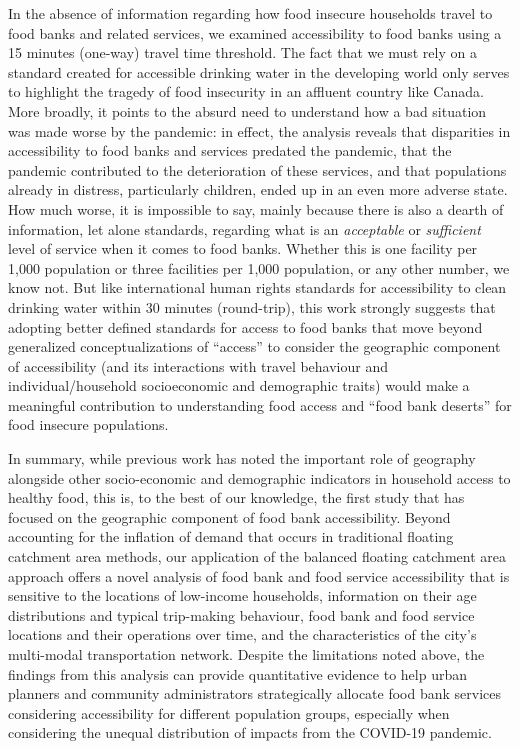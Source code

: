 \documentclass[]{elsarticle} %
\begin{document}
In the absence of information regarding how food insecure households
travel to food banks and related services, we examined accessibility to
food banks using a 15 minutes (one-way) travel time threshold. The fact
that we must rely on a standard created for accessible drinking water in
the developing world only serves to highlight the tragedy of food
insecurity in an affluent country like Canada. More broadly, it points
to the absurd need to understand how a bad situation was made worse by
the pandemic: in effect, the analysis reveals that disparities in
accessibility to food banks and services predated the pandemic, that the
pandemic contributed to the deterioration of these services, and that
populations already in distress, particularly children, ended up in an
even more adverse state. How much worse, it is impossible to say, mainly
because there is also a dearth of information, let alone standards,
regarding what is an \emph{acceptable} or \emph{sufficient} level of
service when it comes to food banks. Whether this is one facility per
1,000 population or three facilities per 1,000 population, or any other
number, we know not. But like international human rights standards for
accessibility to clean drinking water within 30 minutes (round-trip),
this work strongly suggests that adopting better defined standards for
access to food banks that move beyond generalized conceptualizations of
``access'' to consider the geographic component of accessibility (and
its interactions with travel behaviour and individual/household
socioeconomic and demographic traits) would make a meaningful
contribution to understanding food access and ``food bank deserts'' for
food insecure populations.

In summary, while previous work has noted the important role of
geography alongside other socio-economic and demographic indicators in
household access to healthy food, this is, to the best of our knowledge,
the first study that has focused on the geographic component of food
bank accessibility. Beyond accounting for the inflation of demand that
occurs in traditional floating catchment area methods, our application
of the balanced floating catchment area approach offers a novel analysis
of food bank and food service accessibility that is sensitive to the
locations of low-income households, information on their age
distributions and typical trip-making behaviour, food bank and food
service locations and their operations over time, and the
characteristics of the city's multi-modal transportation network.
Despite the limitations noted above, the findings from this analysis can
provide quantitative evidence to help urban planners and community
administrators strategically allocate food bank services considering
accessibility for different population groups, especially when
considering the unequal distribution of impacts from the COVID-19
pandemic.
\end{document}
